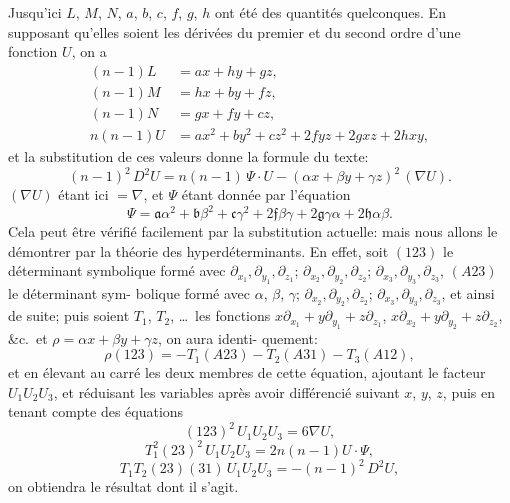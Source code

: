 \documentclass[11pt]{article}
\begin{document}
\medskip
Jusqu'ici $L$, $M$, $N$, $a$, $b$, $c$, $f$, $g$, $h$ ont \'et\'e des quantit\'es quelconques. En supposant
qu'elles soient les d\'eriv\'ees du premier et du second ordre d'une fonction $U$, on a
\begin{align*}
(n - 1) L &= a x + h y + g z,\\
(n - 1) M &= h x + b y + f z,\\
(n - 1) N &= g x + f y + c z,\\
n(n - 1) U &= a x^{2} + b y^{2} + c z^{2} + 2 f y z + 2 g x z + 2 h x y,
\end{align*}
et la substitution de ces valeurs donne la formule du texte:
\[
(n - 1)^{2}\,D^{2} U = n(n - 1)\,\Psi \cdot U - (\alpha x + \beta y + \gamma z)^{2}\,(\nabla U).
\]
$(\nabla U)$ \'etant ici $= \nabla$, et $\Psi$ \'etant donn\'ee par l'\'equation
\[
\Psi = \mathfrak{a}\alpha^{2} + \mathfrak{b}\beta^{2} + \mathfrak{c}\gamma^{2} + 2 \mathfrak{f}\beta\gamma + 2 \mathfrak{g}\gamma\alpha + 2 \mathfrak{h}\alpha\beta.
\]
Cela peut \^etre v\'erifi\'e facilement par la substitution actuelle: mais nous allons le
d\'emontrer par la th\'eorie des hyperd\'eterminants. En effet, soit $(123)$ le d\'eterminant
symbolique form\'e avec $\partial_{x_{1}}, \partial_{y_{1}}, \partial_{z_{1}}$; $\partial_{x_{2}}, \partial_{y_{2}}, \partial_{z_{2}}$; $\partial_{x_{3}}, \partial_{y_{3}}, \partial_{z_{3}}$, $(A23)$ le d\'eterminant sym-
bolique form\'e avec $\alpha$, $\beta$, $\gamma$; $\partial_{x_{2}}, \partial_{y_{2}}, \partial_{z_{2}}$; $\partial_{x_{3}}, \partial_{y_{3}}, \partial_{z_{3}}$, et ainsi de suite; puis soient $T_{1}$, $T_{2}$,
\ldots\ les fonctions $x \partial_{x_{1}} + y \partial_{y_{1}} + z \partial_{z_{1}}$, $x \partial_{x_{2}} + y \partial_{y_{2}} + z \partial_{z_{2}}$, \&c.\ et $\rho = \alpha x + \beta y + \gamma z$, on aura identi-
quement:
\[
\rho(123) = -T_{1}(A 2 3) - T_{2}(A 3 1) - T_{3}(A 1 2),
\]
et en \'elevant au carr\'e les deux membres de cette \'equation, ajoutant le facteur
$U_{1} U_{2} U_{3}$, et r\'eduisant les variables apr\`es avoir diff\'erenci\'e suivant $x$, $y$, $z$, puis en tenant
compte des \'equations
\[
(123)^{2}\,U_{1} U_{2} U_{3} = 6 \nabla U,
\]
\[
T_{1}^{2}(23)^{2}\,U_{1} U_{2} U_{3} = 2 n(n - 1) U \cdot \Psi,
\]
\[
T_{1} T_{2}(23)(31)\,U_{1} U_{2} U_{3} = -(n - 1)^{2}\,D^{2} U,
\]
on obtiendra le r\'esultat dont il s'agit.
\end{document}
